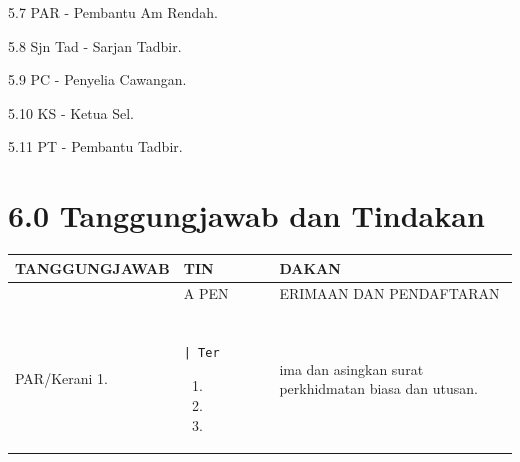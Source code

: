 \documentclass[
]{article}
\begin{document}
5.7 PAR - Pembantu Am Rendah.

5.8 Sjn Tad - Sarjan Tadbir.

5.9 PC - Penyelia Cawangan.

5.10 KS - Ketua Sel.

5.11 PT - Pembantu Tadbir.

\hypertarget{tanggungjawab-dan-tindakan}{%
\section{6.0 Tanggungjawab dan
Tindakan}\label{tanggungjawab-dan-tindakan}}

\begin{longtable}[]{@{}lll@{}}
\toprule
\begin{minipage}[b]{0.30\columnwidth}\raggedright
TANGGUNGJAWAB \textbar{}\strut
\end{minipage} & \begin{minipage}[b]{0.30\columnwidth}\raggedright
\textbar{} TIN\strut
\end{minipage} & \begin{minipage}[b]{0.30\columnwidth}\raggedright
DAKAN\strut
\end{minipage}\tabularnewline
\midrule
\endhead
\begin{minipage}[t]{0.30\columnwidth}\raggedright
\strut
\end{minipage} & \begin{minipage}[t]{0.30\columnwidth}\raggedright
A \textbar{} PEN\strut
\end{minipage} & \begin{minipage}[t]{0.30\columnwidth}\raggedright
ERIMAAN DAN PENDAFTARAN\strut
\end{minipage}\tabularnewline
\begin{minipage}[t]{0.30\columnwidth}\raggedright
PAR/Kerani \textbar{} 1.\strut
\end{minipage} & \begin{minipage}[t]{0.30\columnwidth}\raggedright
\begin{verbatim}
              | Ter
\end{verbatim}

\begin{enumerate}
\def\labelenumi{\arabic{enumi}.}
\setcounter{enumi}{1}
\item
\item
\item
\end{enumerate}\strut
\end{minipage} & \begin{minipage}[t]{0.30\columnwidth}\raggedright
ima dan asingkan surat perkhidmatan biasa dan utusan.


\end{minipage}
\end{longtable}
\end{document}
